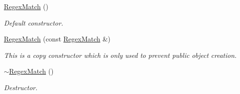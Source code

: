 \begin{DoxyCompactItemize}
\hyperlink{classjpcre2_1_1RegexMatch_a40127e5057e2343848d8c8a6d4c32bcd_a40127e5057e2343848d8c8a6d4c32bcd}{Regex\+Match} ()
\begin{DoxyCompactList}\small\item\em Default constructor. \end{DoxyCompactList}\item 
\hyperlink{classjpcre2_1_1RegexMatch_a098ddb46b2f297870ea548ef07597d94_a098ddb46b2f297870ea548ef07597d94}{Regex\+Match} (const \hyperlink{classjpcre2_1_1RegexMatch}{Regex\+Match} \&)
\begin{DoxyCompactList}\small\item\em This is a copy constructor which is only used to prevent public object creation. \end{DoxyCompactList}\item 
\hyperlink{classjpcre2_1_1RegexMatch_ab6a9f9b8404852e46edd08a5b8712847_ab6a9f9b8404852e46edd08a5b8712847}{$\sim$\+Regex\+Match} ()
\begin{DoxyCompactList}\small\item\em Destructor. \end{DoxyCompactList}\end{DoxyCompactItemize}
